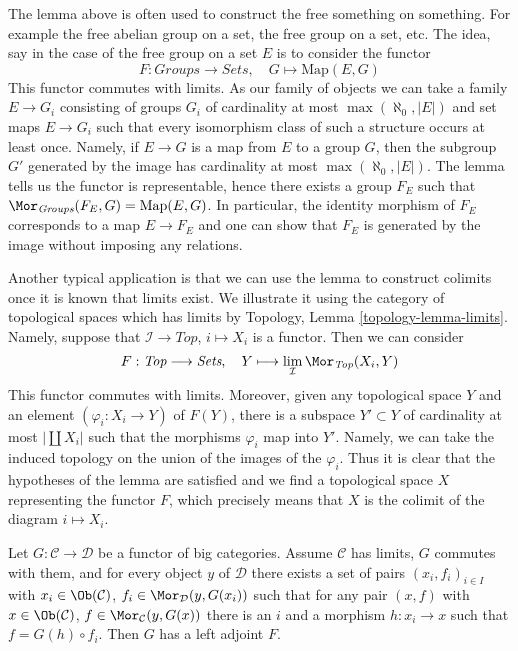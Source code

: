 \begin{remark}
\label{remark-how-to-use-it}
The lemma above is often used to construct the free something on something.
For example the free abelian group on a set, the free group on a set, etc.
The idea, say in the case of the free group on a set $E$ is to
consider the functor
$$
F : \textit{Groups} \to \textit{Sets},\quad
G \longmapsto \text{Map}(E, G)
$$
This functor commutes with limits. As our family of objects
we can take a family $E \to G_i$ consisting of groups $G_i$
of cardinality at most $\max(\aleph_0, |E|)$ and set maps
$E \to G_i$ such that every isomorphism class of such a structure
occurs at least once. Namely, if $E \to G$ is a map from $E$ to
a group $G$, then the subgroup $G'$ generated by the image has
cardinality at most $\max(\aleph_0, |E|)$. The lemma tells us
the functor is representable, hence there exists a group
$F_E$ such that $\Mor_{\textit{Groups}}(F_E, G) = \text{Map}(E, G)$.
In particular, the identity morphism of $F_E$ corresponds to
a map $E \to F_E$ and one can show that $F_E$ is generated by
the image without imposing any relations.

\medskip\noindent
Another typical application is that we can use the lemma to construct
colimits once it is known that limits exist. We illustrate it using
the category of topological spaces which has limits by
Topology, Lemma \ref{topology-lemma-limits}. Namely, suppose
that $\mathcal{I} \to \textit{Top}$, $i \mapsto X_i$ is a functor.
Then we can consider
$$
F : \textit{Top} \longrightarrow \textit{Sets},\quad
Y \longmapsto \lim_\mathcal{I} \Mor_{\textit{Top}}(X_i, Y)
$$
This functor commutes with limits. Moreover, given any topological space
$Y$ and an element $(\varphi_i : X_i \to Y)$ of $F(Y)$, there is
a subspace $Y' \subset Y$ of cardinality at most $|\coprod X_i|$
such that the morphisms $\varphi_i$ map into $Y'$. Namely, we can
take the induced topology on the union of the images of the $\varphi_i$.
Thus it is clear that the hypotheses of the lemma are satisfied and we find a
topological space $X$
representing the functor $F$, which precisely means that $X$ is
the colimit of the diagram $i \mapsto X_i$.
\end{remark}

\begin{theorem}
\label{theorem-adjoint-functor}
Let $G : \mathcal{C} \to \mathcal{D}$ be a functor of big categories.
Assume $\mathcal{C}$ has limits, $G$ commutes with them, and for
every object $y$ of $\mathcal{D}$ there exists a set of pairs
$(x_i, f_i)_{i \in I}$ with $x_i \in \Ob(\mathcal{C})$,
$f_i \in \Mor_\mathcal{D}(y, G(x_i))$ such that for any
pair $(x, f)$ with $x \in \Ob(\mathcal{C})$,
$f \in \Mor_\mathcal{C}(y, G(x))$ there is an $i$ and a morphism
$h : x_i \to x$ such that $f = G(h) \circ f_i$.
Then $G$ has a left adjoint $F$.
\end{theorem}

